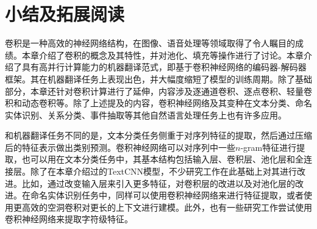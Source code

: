 \sectionnewpage
\section{小结及拓展阅读}

\parinterval 卷积是一种高效的神经网络结构，在图像、语音处理等领域取得了令人瞩目的成绩。本章介绍了卷积的概念及其特性，并对池化、填充等操作进行了讨论。本章介绍了具有高并行计算能力的机器翻译范式，即基于卷积神经网络的编码器-解码器框架。其在机器翻译任务上表现出色，并大幅度缩短了模型的训练周期。除了基础部分，本章还针对卷积计算进行了延伸，内容涉及逐通道卷积、逐点卷积、轻量卷积和动态卷积等。除了上述提及的内容，卷积神经网络及其变种在文本分类、命名实体识别、关系分类、事件抽取等其他自然语言处理任务上也有许多应用。

\parinterval 和机器翻译任务不同的是，文本分类任务侧重于对序列特征的提取，然后通过压缩后的特征表示做出类别预测。卷积神经网络可以对序列中一些$n$-gram特征进行提取，也可以用在文本分类任务中，其基本结构包括输入层、卷积层、池化层和全连接层。除了在本章介绍过的TextCNN模型，不少研究工作在此基础上对其进行改进。比如，通过改变输入层来引入更多特征，对卷积层的改进以及对池化层的改进。在命名实体识别任务中，同样可以使用卷积神经网络来进行特征提取，或者使用更高效的空洞卷积对更长的上下文进行建模。此外，也有一些研究工作尝试使用卷积神经网络来提取字符级特征。








